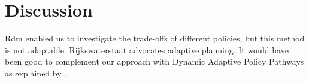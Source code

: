 \section{Discussion}
\label{s:discussion}




Rdm enabled us to investigate the trade-offs of different policies, but this method is not adaptable. Rijkswaterstaat advocates adaptive planning. It would have been good to complement our approach with Dynamic Adaptive Policy Pathways as explained by \cite{kwakkel_coping_2016}.

